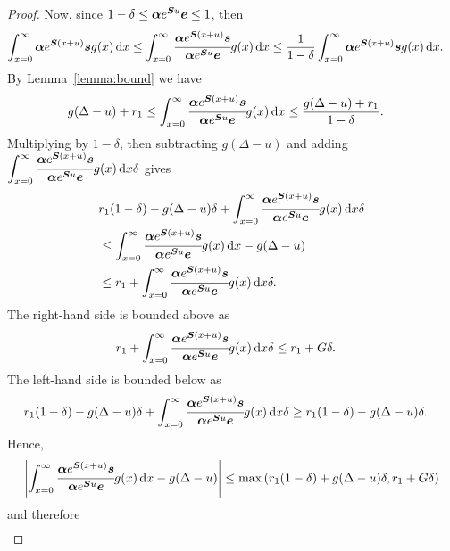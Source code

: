 \begin{proof}
	Now, since \(1-\delta\leq\boldsymbol \alpha e^{\boldsymbol Su}\boldsymbol e\leq 1\), then
	\begin{align*}
		\int_{x=0}^\infty \boldsymbol \alpha  e^{\boldsymbol{S} (x+u)} \boldsymbol s g(x)\, \mathrm{d} x
		\leq \int_{x=0}^\infty \cfrac{\boldsymbol \alpha  e^{\boldsymbol{S} (x+u)} \boldsymbol s}{\boldsymbol \alpha  e^{\boldsymbol{S} u} \boldsymbol e} g(x)\, \mathrm{d} x
		&\leq \frac{1}{1-\delta }\int_{x=0}^\infty \boldsymbol \alpha  e^{\boldsymbol{S} (x+u)} \boldsymbol s g(x)\, \mathrm{d} x.
	\end{align*}
	By Lemma~\ref{lemma:bound} we have 
	\begin{align*}
		g(\Delta-u)+r _1
		&\leq \int_{x=0}^\infty \cfrac{\boldsymbol \alpha  e^{\boldsymbol{S} (x+u)} \boldsymbol s}{\boldsymbol \alpha  e^{\boldsymbol{S} u} \boldsymbol e} g(x)\, \mathrm{d} x
		\leq \frac{g(\Delta-u)+r _1}{1-\delta }. 
	\end{align*}
	Multiplying by \(1-\delta \), then subtracting \(g(\Delta-u)\) and adding \(\displaystyle\int_{x=0}^\infty \cfrac{\boldsymbol \alpha  e^{\boldsymbol{S} (x+u)} \boldsymbol s}{\boldsymbol \alpha  e^{\boldsymbol{S} u} \boldsymbol e} g(x)\, \mathrm{d} x\delta \) gives 
	\begin{align*}
		&r _1(1-\delta ) - g(\Delta-u)\delta +\int_{x=0}^\infty \cfrac{\boldsymbol \alpha  e^{\boldsymbol{S} (x+u)} \boldsymbol s}{\boldsymbol \alpha  e^{\boldsymbol{S} u} \boldsymbol e} g(x)\, \mathrm{d} x\delta 
		\\&\leq \int_{x=0}^\infty \cfrac{\boldsymbol \alpha  e^{\boldsymbol{S} (x+u)} \boldsymbol s}{\boldsymbol \alpha  e^{\boldsymbol{S} u} \boldsymbol e} g(x)\, \mathrm{d} x -g(\Delta-u)
		\\&\leq r _1+\int_{x=0}^\infty \cfrac{\boldsymbol \alpha  e^{\boldsymbol{S} (x+u)} \boldsymbol s}{\boldsymbol \alpha  e^{\boldsymbol{S} u} \boldsymbol e} g(x)\, \mathrm{d} x\delta .
	\end{align*}
	The right-hand side is bounded above as 
	\begin{align*}
		r _1+\int_{x=0}^\infty \cfrac{\boldsymbol \alpha  e^{\boldsymbol{S} (x+u)} \boldsymbol s}{\boldsymbol \alpha  e^{\boldsymbol{S} u} \boldsymbol e} g(x)\, \mathrm{d} x\delta 
		&\leq r _1 + G \delta .
	\end{align*}
	The left-hand side is bounded below as 
	\begin{align*}
		r_1 (1-\delta ) - g(\Delta-u)\delta +\int_{x=0}^\infty \cfrac{\boldsymbol \alpha  e^{\boldsymbol{S} (x+u)} \boldsymbol s}{\boldsymbol \alpha  e^{\boldsymbol{S} u} \boldsymbol e} g(x)\, \mathrm{d} x\delta 
		&\geq r _1(1-\delta ) - g(\Delta-u)\delta .
	\end{align*}
	Hence, 
	\begin{align}
		\left|\int_{x=0}^\infty \cfrac{\boldsymbol \alpha  e^{\boldsymbol{S} (x+u)} \boldsymbol s}{\boldsymbol \alpha  e^{\boldsymbol{S} u} \boldsymbol e} g(x)\, \mathrm{d} x -g(\Delta-u)\right| \leq \max\left(r _1(1-\delta )+g(\Delta-u)\delta , r _1 + G \delta \right)
	\end{align}
	and therefore 
	\begin{align}

\end{align}
\end{proof}
